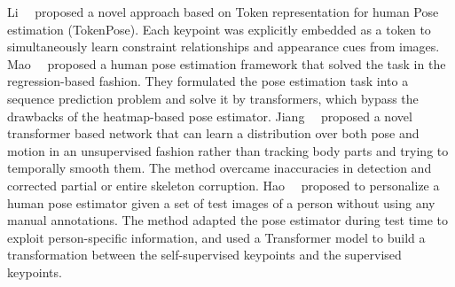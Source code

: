 Li~\etal~ proposed a novel approach based on Token representation for human Pose estimation (TokenPose). Each keypoint was explicitly embedded as a token to simultaneously learn constraint relationships and appearance cues from images.
Mao~\etal~ proposed a human pose estimation framework that solved the task in the regression-based fashion. They formulated the pose estimation task into a sequence prediction problem and solve it by transformers, which bypass the drawbacks of the heatmap-based pose estimator.
Jiang~\etal~ proposed a novel transformer based network that can learn a distribution over both pose and motion in an unsupervised fashion rather than tracking body parts and trying to temporally smooth them. The method overcame inaccuracies in detection and corrected partial or entire skeleton corruption.
Hao~\etal~ proposed to personalize a human pose estimator given a set of test images of a person without using any manual annotations. The method adapted the pose estimator during test time to exploit person-specific information, and used a Transformer model to build a transformation between the self-supervised keypoints and the supervised keypoints.


